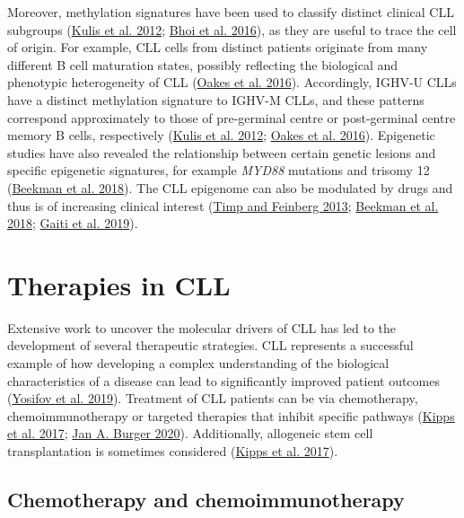 \documentclass[11pt, a4paper, twosided]{book}
\begin{document}
Moreover, methylation signatures have been used to classify distinct clinical CLL subgroups (\protect\hyperlink{ref-Kulis2012}{Kulis et al. 2012}; \protect\hyperlink{ref-Bhoi2016}{Bhoi et al. 2016}), as they are useful to trace the cell of origin. For example, CLL cells from distinct patients originate from many different B cell maturation states, possibly reflecting the biological and phenotypic heterogeneity of CLL (\protect\hyperlink{ref-Oakes2016}{Oakes et al. 2016}). Accordingly, IGHV-U CLLs have a distinct methylation signature to IGHV-M CLLs, and these patterns correspond approximately to those of pre-germinal centre or post-germinal centre memory B cells, respectively (\protect\hyperlink{ref-Kulis2012}{Kulis et al. 2012}; \protect\hyperlink{ref-Oakes2016}{Oakes et al. 2016}). Epigenetic studies have also revealed the relationship between certain genetic lesions and specific epigenetic signatures, for example \emph{MYD88} mutations and trisomy 12 (\protect\hyperlink{ref-Beekman2018}{Beekman et al. 2018}). The CLL epigenome can also be modulated by drugs and thus is of increasing clinical interest (\protect\hyperlink{ref-Timp2013}{Timp and Feinberg 2013}; \protect\hyperlink{ref-Beekman2018}{Beekman et al. 2018}; \protect\hyperlink{ref-Gaiti2019}{Gaiti et al. 2019}).

\hypertarget{intro-therapies}{%
\section{Therapies in CLL}\label{intro-therapies}}

Extensive work to uncover the molecular drivers of CLL has led to the development of several therapeutic strategies. CLL represents a successful example of how developing a complex understanding of the biological characteristics of a disease can lead to significantly improved patient outcomes (\protect\hyperlink{ref-Yosifov2019}{Yosifov et al. 2019}).
Treatment of CLL patients can be via chemotherapy, chemoimmunotherapy or targeted therapies that inhibit specific pathways (\protect\hyperlink{ref-Kipps2017}{Kipps et al. 2017}; \protect\hyperlink{ref-Burger2020}{Jan A. Burger 2020}). Additionally, allogeneic stem cell transplantation is sometimes considered (\protect\hyperlink{ref-Kipps2017}{Kipps et al. 2017}).

\hypertarget{intro-chemotherapy}{%
\subsection{Chemotherapy and chemoimmunotherapy}\label{intro-chemotherapy}}
\end{document}
